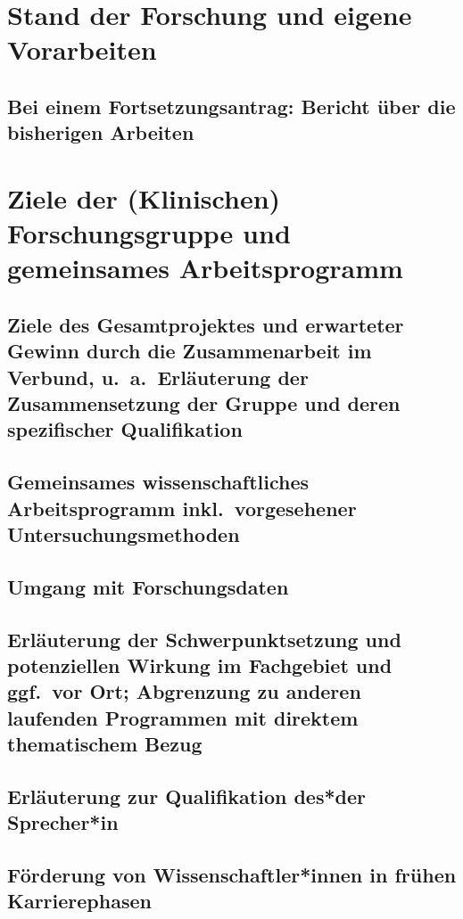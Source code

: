 \documentclass[german, 53.02]{proposal}
\begin{document}
\section{Stand der Forschung und eigene Vorarbeiten}

\subsection{Bei einem Fortsetzungsantrag: Bericht über die bisherigen Arbeiten}

\section{Ziele der (Klinischen) Forschungsgruppe und gemeinsames Arbeitsprogramm}

\subsection{Ziele des Gesamtprojektes und erwarteter Gewinn durch die Zusammenarbeit im Verbund, u.\ a.\ Erläuterung der Zusammensetzung der Gruppe und deren spezifischer Qualifikation}

\subsection{Gemeinsames wissenschaftliches Arbeitsprogramm inkl.\ vorgesehener Untersuchungsmethoden}

\subsection{Umgang mit Forschungsdaten}

\subsection{Erläuterung der Schwerpunktsetzung und potenziellen Wirkung im Fachgebiet und ggf.\ vor Ort; Abgrenzung zu anderen laufenden Programmen mit direktem thematischem Bezug}

\subsection{Erläuterung zur Qualifikation des*der Sprecher*in}

\subsection{Förderung von Wissenschaftler*innen in frühen Karrierephasen}
\end{document}
